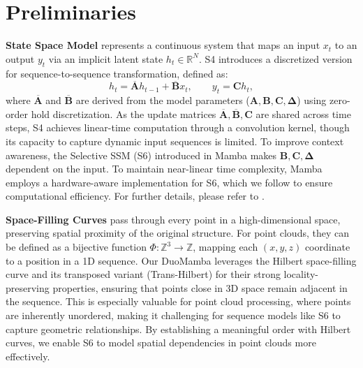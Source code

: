 \section{Preliminaries}
\label{sec:preliminaries}
\vspace{1mm} \noindent\textbf{State Space Model}  
represents a continuous system that maps an input $x_{t}$ to an output $y_{t}$ via an implicit latent state $h_{t} \in \mathbb{R}^N$. S4 \cite{s4} introduces a discretized version for sequence-to-sequence transformation, defined as: 
\begin{equation} \label{eq:ssm}
h_{t} = \overline{\boldsymbol{A}} h_{t-1} + \overline{\boldsymbol{B}} x_{t},\qquad y_{t} = \boldsymbol{C}h_{t},
\end{equation}
where $\overline{\boldsymbol{A}}$ and $\overline{\boldsymbol{B}}$ are derived from the model parameters ($\boldsymbol{A}, \boldsymbol{B}, \boldsymbol{C}, \boldsymbol{\Delta}$) using zero-order hold discretization. 
As the update matrices $\overline{\boldsymbol{A}}, \overline{\boldsymbol{B}}, \boldsymbol{C}$ are shared across time steps, S4 achieves linear-time computation through a convolution kernel, though its capacity to capture dynamic input sequences is limited. To improve context awareness, the Selective SSM (S6) introduced in Mamba \cite{mamba} makes $\boldsymbol{B}, \boldsymbol{C}, \boldsymbol{\Delta}$ dependent on the input. To maintain near-linear time complexity, Mamba \cite{mamba} employs a hardware-aware implementation for S6, which we follow to ensure computational efficiency. For further details, please refer to \cite{mamba}.

\vspace{1mm} \noindent\textbf{Space-Filling Curves} %
pass through every point in a high-dimensional space, preserving spatial proximity of the original structure. For point clouds, they can be defined as a bijective function \( \Phi: \mathbb{Z}^3 \to \mathbb{Z} \), mapping each \((x, y, z)\) coordinate to a position in a 1D sequence. Our DuoMamba leverages the Hilbert space-filling curve \cite{hilbert_curve} and its transposed variant (Trans-Hilbert) for their strong locality-preserving properties, ensuring that points close in 3D space remain adjacent in the sequence. This is especially valuable for point cloud processing, where points are inherently unordered, making it challenging for sequence models like S6 to capture geometric relationships. By establishing a meaningful order with Hilbert curves, we enable S6 to model spatial dependencies in point clouds more effectively.

